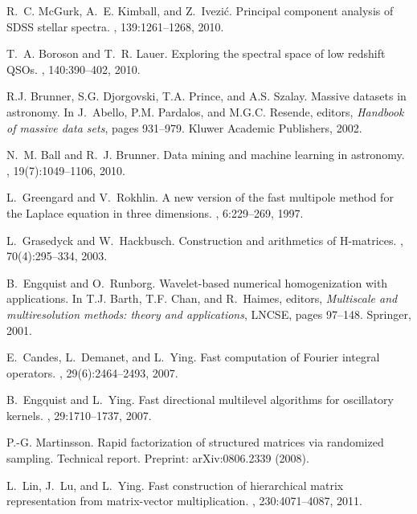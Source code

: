 \documentclass[twoside]{article}
\begin{document}
\begin{small}
\begin{thebibliography}{100}
R.~C. McGurk, A.~E. Kimball, and Z.~Ivezi\'{c}.
\newblock Principal component analysis of {SDSS} stellar spectra.
, 139:1261--1268, 2010.

T.~A. Boroson and T.~R. Lauer.
\newblock Exploring the spectral space of low redshift {QSO}s.
, 140:390--402, 2010.

R.J. Brunner, S.G. Djorgovski, T.A. Prince, and A.S. Szalay.
\newblock Massive datasets in astronomy.
\newblock In J.~Abello, P.M. Pardalos, and M.G.C. Resende, editors, {\em
  Handbook of massive data sets}, pages 931--979. Kluwer Academic Publishers,
  2002.

N.~M. Ball and R.~J. Brunner.
\newblock Data mining and machine learning in astronomy.
, 19(7):1049--1106,
  2010.

L.~Greengard and V.~Rokhlin.
\newblock A new version of the fast multipole method for the {L}aplace equation
  in three dimensions.
, 6:229--269, 1997.

L.~Grasedyck and W.~Hackbusch.
\newblock Construction and arithmetics of {H}-matrices.
, 70(4):295--334, 2003.

B.~Engquist and O.~Runborg.
\newblock Wavelet-based numerical homogenization with applications.
\newblock In T.J. Barth, T.F. Chan, and R.~Haimes, editors, {\em Multiscale and
  multiresolution methods: theory and applications}, LNCSE, pages 97--148.
  Springer, 2001.

E.~Candes, L.~Demanet, and L.~Ying.
\newblock Fast computation of {F}ourier integral operators.
, 29(6):2464--2493, 2007.

B.~Engquist and L.~Ying.
\newblock Fast directional multilevel algorithms for oscillatory kernels.
, 29:1710--1737, 2007.

P.-G. Martinsson.
\newblock Rapid factorization of structured matrices via randomized sampling.
\newblock Technical report.
\newblock Preprint: arXiv:0806.2339 (2008).

L.~Lin, J.~Lu, and L.~Ying.
\newblock Fast construction of hierarchical matrix representation from
  matrix-vector multiplication.
, 230:4071--4087, 2011.


\end{thebibliography}
\end{small}
\end{document}

